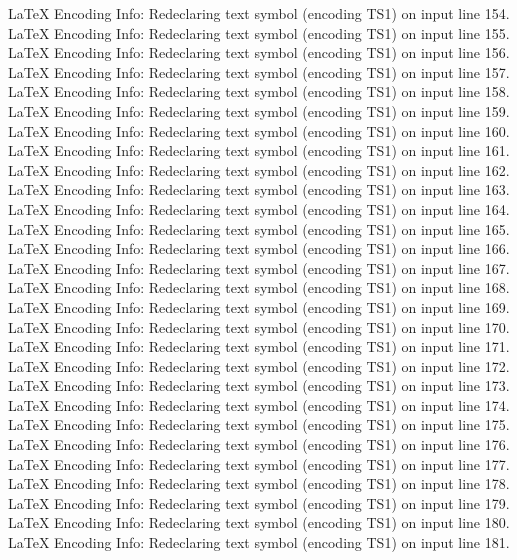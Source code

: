 LaTeX Encoding Info:    Redeclaring text symbol \textpilcrow (encoding TS1) on input line 154.
LaTeX Encoding Info:    Redeclaring text symbol \textbaht (encoding TS1) on input line 155.
LaTeX Encoding Info:    Redeclaring text symbol \textnumero (encoding TS1) on input line 156.
LaTeX Encoding Info:    Redeclaring text symbol \textdiscount (encoding TS1) on input line 157.
LaTeX Encoding Info:    Redeclaring text symbol \textestimated (encoding TS1) on input line 158.
LaTeX Encoding Info:    Redeclaring text symbol \textopenbullet (encoding TS1) on input line 159.
LaTeX Encoding Info:    Redeclaring text symbol \textservicemark (encoding TS1) on input line 160.
LaTeX Encoding Info:    Redeclaring text symbol \textlquill (encoding TS1) on input line 161.
LaTeX Encoding Info:    Redeclaring text symbol \textrquill (encoding TS1) on input line 162.
LaTeX Encoding Info:    Redeclaring text symbol \textcent (encoding TS1) on input line 163.
LaTeX Encoding Info:    Redeclaring text symbol \textsterling (encoding TS1) on input line 164.
LaTeX Encoding Info:    Redeclaring text symbol \textcurrency (encoding TS1) on input line 165.
LaTeX Encoding Info:    Redeclaring text symbol \textyen (encoding TS1) on input line 166.
LaTeX Encoding Info:    Redeclaring text symbol \textbrokenbar (encoding TS1) on input line 167.
LaTeX Encoding Info:    Redeclaring text symbol \textsection (encoding TS1) on input line 168.
LaTeX Encoding Info:    Redeclaring text symbol \textasciidieresis (encoding TS1) on input line 169.
LaTeX Encoding Info:    Redeclaring text symbol \textcopyright (encoding TS1) on input line 170.
LaTeX Encoding Info:    Redeclaring text symbol \textordfeminine (encoding TS1) on input line 171.
LaTeX Encoding Info:    Redeclaring text symbol \textcopyleft (encoding TS1) on input line 172.
LaTeX Encoding Info:    Redeclaring text symbol \textlnot (encoding TS1) on input line 173.
LaTeX Encoding Info:    Redeclaring text symbol \textcircledP (encoding TS1) on input line 174.
LaTeX Encoding Info:    Redeclaring text symbol \textregistered (encoding TS1) on input line 175.
LaTeX Encoding Info:    Redeclaring text symbol \textasciimacron (encoding TS1) on input line 176.
LaTeX Encoding Info:    Redeclaring text symbol \textdegree (encoding TS1) on input line 177.
LaTeX Encoding Info:    Redeclaring text symbol \textpm (encoding TS1) on input line 178.
LaTeX Encoding Info:    Redeclaring text symbol \texttwosuperior (encoding TS1) on input line 179.
LaTeX Encoding Info:    Redeclaring text symbol \textthreesuperior (encoding TS1) on input line 180.
LaTeX Encoding Info:    Redeclaring text symbol \textasciiacute (encoding TS1) on input line 181.
